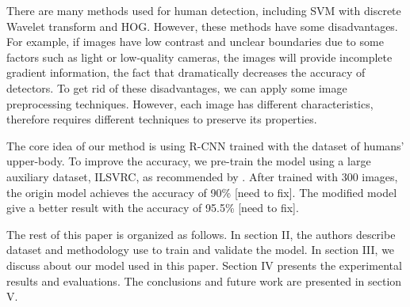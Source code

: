 \documentclass[conference]{IEEEtran}
\begin{document}
There are many methods used for human detection, including SVM with discrete Wavelet transform \cite{wavelet} and HOG\cite{hog}. However, these methods have some disadvantages. For example, if images have low contrast and unclear boundaries due to some factors such as light or low-quality cameras, the images will provide incomplete gradient information, the fact that dramatically decreases the accuracy of detectors. To get rid of these disadvantages, we can apply some image preprocessing techniques. However, each image has different characteristics, therefore requires different techniques to preserve its properties. 

The core idea of our method is using R-CNN trained with the dataset of humans' upper-body. To improve the accuracy, we pre-train the model using a large auxiliary dataset, ILSVRC, as recommended by \cite{rcnn}. After trained with 300 images, the origin model achieves the accuracy of 90\% [need to fix]. The modified model give a better result with the accuracy of 95.5\% [need to fix].

The rest of this paper is organized as follows. In section II, the authors describe dataset and methodology use to train and validate the model. In section III, we discuss about our model used in this paper. Section IV presents the experimental results and evaluations. The conclusions and future work are presented in section V. 

%
%
\end{document}
